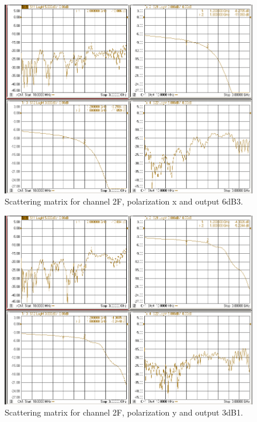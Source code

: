 \documentclass[12pt,a4paper,oneside]{article}
\begin{document}
\begin{figure}[H]
\centering
\includegraphics[width=0.9\linewidth]{VNA_results/2Fx_6dB3.png}
\caption{Scattering matrix for channel 2F, polarization x and output 6dB3.}
\label{fig:2Fx_6dB3}
\end{figure}


\begin{figure}[H]
\centering
\includegraphics[width=0.9\linewidth]{VNA_results/2Fy_3dB1.png}
\caption{Scattering matrix for channel 2F, polarization y and output 3dB1.}
\label{fig:2Fy_3dB1}
\end{figure}
\end{document}
